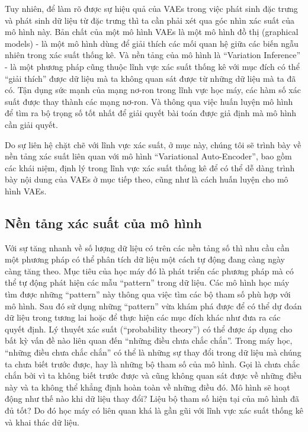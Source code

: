         Tuy nhiên, để làm rõ được sự hiệu quả của VAEs trong việc phát sinh đặc trưng và phát sinh dữ liệu từ đặc trưng thì ta cần phải xét qua góc nhìn xác suất của mô hình này.
        Bản chất của một mô hình VAEs là một mô hình đồ thị (graphical models) - là một mô hình dùng để giải thích các mối quan hệ giữa các biến ngẫu nhiên trong xác suất thống kê. Và nền tảng của mô hình là ``Variation Inference'' - là một phương pháp cũng thuộc lĩnh vực xác suất thống kê với mục đích có thể ``giải thích'' được dữ liệu mà ta không quan sát được từ những dữ liệu mà ta đã có. Tận dụng sức mạnh của mạng nơ-ron trong lĩnh vực học máy, các hàm số xác suất được thay thành các mạng nơ-ron. Và thông qua việc huấn luyện mô hình để tìm ra bộ trọng số tốt nhất để giải quyết bài toán được giả định mà mô hình cần giải quyết. 

        Do sự liên hệ chặt chẽ với lĩnh vực xác suất, ở mục này, chúng tôi sẽ trình bày về nền tảng xác suất liên quan với mô hình ``Variational Auto-Encoder'', bao gồm các khái niệm, định lý trong lĩnh vực xác suất thống kê để có thể dễ dàng trình bày nội dung của VAEs ở mục tiếp theo, cũng như là cách huấn luyện cho mô hình VAEs. 
        

    \subsection{Nền tảng xác suất của mô hình} \label{chap2/subsec21}
        
        Với sự tăng nhanh về số lượng dữ liệu có trên các nền tảng số thì nhu cầu cần một phương pháp có thể phân tích dữ liệu một cách tự động đang  càng ngày càng tăng theo.
        Mục tiêu của học máy đó là phát triển các phương pháp mà có thể tự động phát hiện các mẫu ``pattern'' trong dữ liệu.
        Các mô hình học máy tìm được những ``pattern'' này thông qua việc tìm các bộ tham số phù hợp với mô hình.
        Sau đó sử dụng những ``pattern'' vừa khám phá được để có thể dự đoán dữ liệu trong tương lai hoặc để thực hiện các mục đích khác như đưa ra các quyết định.
        Lý thuyết xác suất (``probability theory'') có thể được áp dụng cho bất kỳ vấn đề nào liên quan đến ``những điều chưa chắc chắn''. 
        Trong máy học, ``những điều chưa chắc chắn'' có thể là những sự thay đổi trong dữ liệu mà chúng ta chưa biết trước được, hay là những bộ tham số của mô hình.
        Gọi là chưa chắc chắn bởi vì ta không biết trước được và cũng không quan sát được về những điều này và ta không thể khẳng định hoàn toàn về những điều đó.
        Mô hình sẽ hoạt động như thế nào khi dữ liệu thay đổi? Liệu bộ tham số hiện tại của mô hình đã đủ tốt?
        Do đó học máy có liên quan khá là gần gũi với lĩnh vực xác suất thống kê và khai thác dữ liệu.

